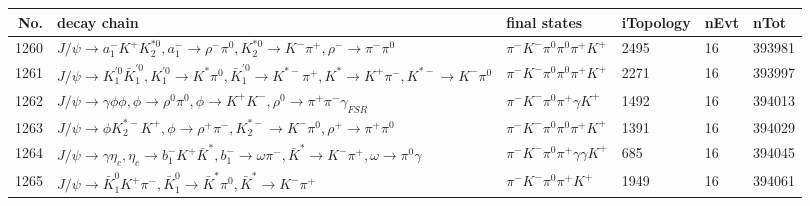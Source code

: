 \begin{table}[htbp] 
\begin{center}
\begin{small}
\begin{tabular}{rlllll}\hline\hline
 No. & decay chain & final states &  iTopology & nEvt & nTot \\\hline
1260&$J/\psi       \rightarrow a_{1}^{-}      K^{+}          K_2^{*0}       , a_{1}^{-}       \rightarrow \rho^{-}      \pi^{0}        , K_2^{*0}        \rightarrow K^{-}          \pi^{+}        , \rho^{-}       \rightarrow \pi^{-}        \pi^{0}        $&$\pi^{-}        K^{-}          \pi^{0}        \pi^{0}        \pi^{+}        K^{+}          $& 2495&   16&393981\\
1261&$J/\psi       \rightarrow K_1^{'0}      \bar{K}_1^{'0}, K_1^{'0}       \rightarrow K^{*}          \pi^{0}        , \bar{K}_1^{'0} \rightarrow K^{*-}         \pi^{+}        , K^{*}           \rightarrow K^{+}          \pi^{-}        , K^{*-}          \rightarrow K^{-}          \pi^{0}        $&$\pi^{-}        K^{-}          \pi^{0}        \pi^{0}        \pi^{+}        K^{+}          $& 2271&   16&393997\\
1262&$J/\psi       \rightarrow \gamma       \phi           \phi           , \phi            \rightarrow \rho^{0}      \pi^{0}        , \phi            \rightarrow K^{+}          K^{-}          , \rho^{0}       \rightarrow \pi^{+}        \pi^{-}        \gamma_{FSR} $&$\pi^{-}        K^{-}          \pi^{0}        \pi^{+}        \gamma       K^{+}          $& 1492&   16&394013\\
1263&$J/\psi       \rightarrow \phi           K_2^{*-}       K^{+}          , \phi            \rightarrow \rho^{+}      \pi^{-}        , K_2^{*-}        \rightarrow K^{-}          \pi^{0}        , \rho^{+}       \rightarrow \pi^{+}        \pi^{0}        $&$\pi^{-}        K^{-}          \pi^{0}        \pi^{0}        \pi^{+}        K^{+}          $& 1391&   16&394029\\
1264&$J/\psi       \rightarrow \gamma       \eta_{c}    , \eta_{c}     \rightarrow b_{1}^{-}      K^{+}          \bar{K}^{*}   , b_{1}^{-}       \rightarrow \omega         \pi^{-}        , \bar{K}^{*}    \rightarrow K^{-}          \pi^{+}        , \omega          \rightarrow \pi^{0}        \gamma       $&$\pi^{-}        K^{-}          \pi^{0}        \pi^{+}        \gamma       \gamma       K^{+}          $&  685&   16&394045\\
1265&$J/\psi       \rightarrow \bar{K}_1^{0} K^{+}          \pi^{-}        , \bar{K}_1^{0}  \rightarrow \bar{K}^{*}   \pi^{0}        , \bar{K}^{*}    \rightarrow K^{-}          \pi^{+}        $&$\pi^{-}        K^{-}          \pi^{0}        \pi^{+}        K^{+}          $& 1949&   16&394061\\

\end{tabular}
\end{small}
\end{center}
\end{table}
